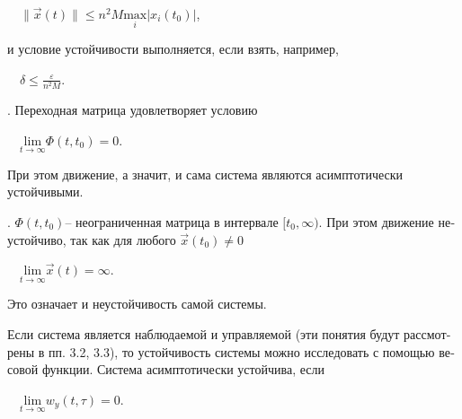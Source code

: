 \documentclass[a4paper]{article}
\begin{document}
{\begin{russian}\sffamily
\ \  $\|\vec x(t)\|\le n^2M\underset i{\text{max}}|x_i(t_0)|$,
\end{russian}}

{\begin{russian}\sffamily
и условие устойчивости выполняется, если взять, например,
\end{russian}}

{\begin{russian}\sffamily
\ \  $δ\le \frac ε{n^2M}$.
\end{russian}}

{\begin{russian}. Переходная матрица удовлетворяет условию
\end{russian}}

{\begin{russian}\sffamily
\ \  $\underset{t\rightarrow \infty }{\text{lim}}Φ(t,t_0)=0$.\ \ 
\end{russian}}

{\begin{russian}\sffamily
При этом движение, а значит, и сама система являются асимптотически устойчивыми.
\end{russian}}

{\begin{russian}.  $Φ(t,t_0)$– неограниченная матрица в интервале  $[t_0,\infty )$. При этом движение неустойчиво, так как для любого 
$\vec x(t_0)\neq 0$
\end{russian}}

{\begin{russian}\sffamily
\ \  $\underset{t\rightarrow \infty }{\text{lim}}\vec x(t)=\infty $.
\end{russian}}

{\begin{russian}\sffamily
Это означает и неустойчивость самой системы.
\end{russian}}

{\begin{russian}\sffamily
Если система является наблюдаемой и управляемой (эти понятия будут рассмотрены в пп. 3.2, 3.3), то устойчивость системы
можно исследовать с помощью весовой функции. Система асимптотически устойчива, если
\end{russian}}

{\begin{russian}\sffamily
\ \   $\underset{t\rightarrow \infty }{\text{lim}}w_y(t,τ)=0$.
\end{russian}}
\end{document}
